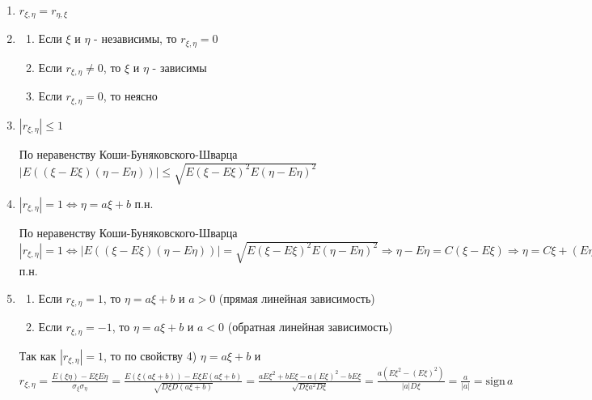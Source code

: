 \documentclass[12pt]{article}
\begin{document}
\begin{enumerate}
    \item $r_{\xi, \eta} = r_{\eta, \xi}$

    \item \begin{enumerate}
        \item Если $\xi$ и $\eta$ - независимы, то $r_{\xi,\eta} = 0$

        \item Если $r_{\xi,\eta} \neq 0$, то $\xi$ и $\eta$ - зависимы

        \item Если $r_{\xi,\eta} = 0$, то неясно
    \end{enumerate}

    \item $|r_{\xi,\eta}| \leq 1$

    \begin{MyProof}
        По неравенству Коши-Буняковского-Шварца $|E((\xi - E\xi)(\eta - E\eta))| \leq \sqrt{E(\xi - E\xi)^2 E(\eta - E\eta)^2}$
    \end{MyProof}

    \item $|r_{\xi,\eta}| = 1 \Longleftrightarrow \eta = a \xi + b$ п.н.

    \begin{MyProof}
        По неравенству Коши-Буняковского-Шварца $|r_{\xi,\eta}| = 1 \Longleftrightarrow 
        |E((\xi - E\xi)(\eta - E\eta))| = \sqrt{E(\xi - E\xi)^2 E(\eta - E\eta)^2} \Longrightarrow \eta - E\eta = C(\xi - E\xi) \Longrightarrow \eta = C\xi + (E\eta - CE\xi)$ п.н.
    \end{MyProof}

    \item \begin{enumerate} 
        \item Если $r_{\xi,\eta} = 1$, то $\eta = a\xi + b$ и $a > 0$ (прямая линейная зависимость)

        \item Если $r_{\xi,\eta} = -1$, то $\eta = a\xi + b$ и $a < 0$ (обратная линейная зависимость)
    \end{enumerate}

    \begin{MyProof}
        Так как $|r_{\xi,\eta}| = 1$, то по свойству 4) $\eta = a\xi + b$ и $r_{\xi,\eta} = \frac{E(\xi\eta) - E\xi E\eta}{\sigma_\xi \sigma_\eta} = 
        \frac{E(\xi(a\xi + b)) - E\xi E(a\xi + b)}{\sqrt{D\xi D(a\xi + b)}} = \frac{aE\xi^2 + bE\xi - a(E\xi)^2 - bE\xi}{\sqrt{D\xi a^2 D\xi}} = \frac{a(E\xi^2 - (E\xi)^2)}{|a|D\xi} = \frac{a}{|a|} = \mathrm{sign} \,a$
    \end{MyProof}
\end{enumerate}
\end{document}
